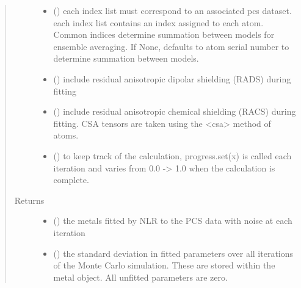 \documentclass[a4paper,10pt,english,openany,oneside]{sphinxmanual}
\begin{document}
\begin{fulllineitems}
\begin{quote}
\begin{description}
\begin{itemize}
\item {} 
 (\sphinxstyleliteralemphasis{\sphinxupquote{, }}) \textendash{} each index list must correspond to an associated pcs dataset.
each index list contains an index assigned to each atom.
Common indices determine summation between models
for ensemble averaging.
If None, defaults to atom serial number to determine summation
between models.

\item {} 
 (\sphinxstyleliteralemphasis{\sphinxupquote{, }}) \textendash{} include residual anisotropic dipolar shielding (RADS) during fitting

\item {} 
 (\sphinxstyleliteralemphasis{\sphinxupquote{, }}) \textendash{} include residual anisotropic chemical shielding (RACS) during fitting.
CSA tensors are taken using the \textless{}csa\textgreater{} method of atoms.

\item {} 
 (\sphinxstyleliteralemphasis{\sphinxupquote{, }}) \textendash{} to keep track of the calculation, progress.set(x) is called each
iteration and varies from 0.0 -\textgreater{} 1.0 when the calculation is complete.

\end{itemize}

\item[{Returns}] \leavevmode
\begin{itemize}
\item {} 
 () \textendash{} the metals fitted by NLR to the PCS data with noise at each iteration

\item {} 
 () \textendash{} the standard deviation in fitted parameters over all iterations of the
Monte Carlo simulation.
These are stored within the metal object. All unfitted parameters
are zero.

\end{itemize}


\end{description}\end{quote}

\end{fulllineitems}
\end{document}

